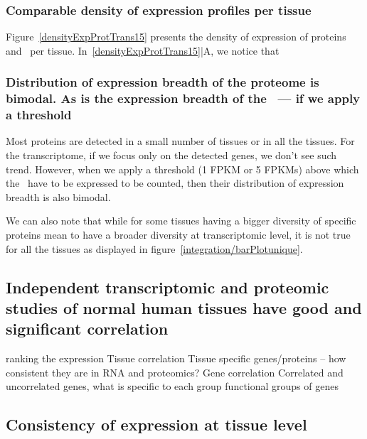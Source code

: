 \subsubsection{Comparable density of expression profiles per tissue}
Figure~\ref{densityExpProtTrans15} presents the density of expression
of proteins and \mRNAs\ per tissue. In~\ref{densityExpProtTrans15}|A,
we notice that 


\subsubsection{Distribution of expression breadth of the proteome is bimodal. As is
the expression breadth of the \mRNAs\ --- if we apply a threshold}

Most proteins are detected in a small number of tissues or in all the tissues.
For the transcriptome, if we focus only on the detected genes, we don’t see
such trend. However, when we apply a threshold (1 \gls{FPKM} or 5 \glspl{FPKM})
above which the \mRNAs\ have to be expressed to be counted, then their distribution
of expression breadth is also bimodal.

We can also note that while for some tissues having a bigger diversity of
specific proteins mean to have a broader diversity at transcriptomic level,
it is not true for all the tissues as displayed in
figure~\ref{integration/barPlotunique}.


\label{sec:IntegrationProteinBimodalExpre}




\subsection{Independent transcriptomic and proteomic studies of normal
human tissues have good and significant correlation}
\label{sec:IntegrationGoodCorrProtTrans}





 ranking the expression
Tissue correlation
Tissue specific genes/proteins – how consistent they are in RNA and proteomics?
Gene correlation
Correlated and uncorrelated genes, what is specific to each group
functional groups of genes


\subsection{Consistency of expression at tissue level}
